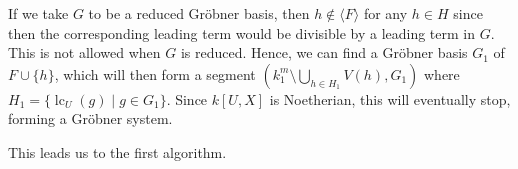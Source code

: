 \documentclass[a4paper, 12pt]{article}
\DeclareMathOperator{\LC}{lc}
\theoremstyle{changedot}
\theoremstyle{changedotbreak}
\theoremstyle{nonumberplain}
\begin{document}
If we take $G$ to be a reduced Gröbner basis, then $h \notin \langle F \rangle$ for any $h \in H$ since then the corresponding leading term would be divisible by a leading term in $G$. This is not allowed when $G$ is reduced. Hence, we can find a Gröbner basis $G_{1}$ of $F \cup \{h\}$, which will then form a segment $(k_{1}^{m} \setminus \bigcup_{h \in H_{1}} V(h), G_{1})$ where $H_{1} = \{\LC_{U}(g) \mid g \in G_{1}\}$. Since $k[U, X]$ is Noetherian, this will eventually stop, forming a Gröbner system.

This leads us to the first algorithm.







\printbibliography


\appendix
\end{document}
